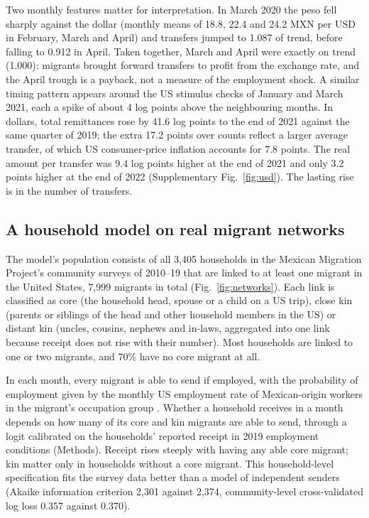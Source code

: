 \documentclass[11pt]{article}
\begin{document}
Two monthly features matter for interpretation. In March 2020 the peso fell sharply against the dollar (monthly means of 18.8, 22.4 and 24.2 MXN per USD in February, March and April) and transfers jumped to 1.087 of trend, before falling to 0.912 in April. Taken together, March and April were exactly on trend (1.000): migrants brought forward transfers to profit from the exchange rate, and the April trough is a payback, not a measure of the employment shock. A similar timing pattern appears around the US stimulus checks of January and March 2021, each a spike of about 4 log points above the neighbouring months. In dollars, total remittances rose by 41.6 log points to the end of 2021 against the same quarter of 2019; the extra 17.2 points over counts reflect a larger average transfer, of which US consumer-price inflation accounts for 7.8 points. The real amount per transfer was 9.4 log points higher at the end of 2021 and only 3.2 points higher at the end of 2022 (Supplementary Fig.~\ref{fig:usd}). The lasting rise is in the number of transfers.

\subsection{A household model on real migrant networks}

The model's population consists of all 3,405 households in the Mexican Migration Project's community surveys of 2010--19 \citep{mmp} that are linked to at least one migrant in the United States, 7,999 migrants in total (Fig.~\ref{fig:networks}). Each link is classified as core (the household head, spouse or a child on a US trip), close kin (parents or siblings of the head and other household members in the US) or distant kin (uncles, cousins, nephews and in-laws, aggregated into one link because receipt does not rise with their number). Most households are linked to one or two migrants, and 70\% have no core migrant at all.

In each month, every migrant is able to send if employed, with the probability of employment given by the monthly US employment rate of Mexican-origin workers in the migrant's occupation group \citep{ipumscps}. Whether a household receives in a month depends on how many of its core and kin migrants are able to send, through a logit calibrated on the households' reported receipt in 2019 employment conditions (Methods). Receipt rises steeply with having any able core migrant; kin matter only in households without a core migrant. This household-level specification fits the survey data better than a model of independent senders (Akaike information criterion 2,301 against 2,374, community-level cross-validated log loss 0.357 against 0.370).
\end{document}
